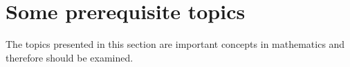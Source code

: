 \appendix

\chapter{Some prerequisite topics}

The topics presented in this section are important concepts in mathematics and therefore should be
examined.
